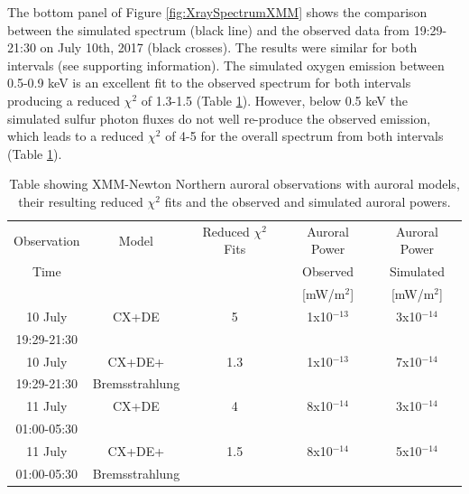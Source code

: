 \documentclass[draft]{agujournal2018}
\begin{document}
The bottom panel of Figure \ref{fig:XraySpectrumXMM} shows the comparison between the simulated spectrum (black line) and the observed data from 19:29-21:30 on July 10th, 2017 (black crosses).
The results were similar for both intervals (see supporting information).
The simulated oxygen emission between 0.5-0.9 keV is an excellent fit to the observed spectrum for both intervals producing a reduced $\chi^2$ of 1.3-1.5 (Table \ref{tab:XMMComparison}).
However, below 0.5 keV the simulated sulfur photon fluxes do not well re-produce the observed emission, which leads to a reduced $\chi^2$ of 4-5 for the overall spectrum from both intervals (Table \ref{tab:XMMComparison}).

\begin{table}
    \centering
    \begin{tabular}{c|c|c|c|c}
    Observation & Model & Reduced $\chi^2$ Fits & Auroral Power & Auroral Power  \\
    Time &  &  & Observed & Simulated  \\
     &  &  & [mW/m$^2$] & [mW/m$^2$] \\ \cline{1-5}
     10 July     & CX+DE          & 5   & 1x10$^{-13}$ & 3x10$^{-14}$ \\
     19:29-21:30 &                &     &              &              \\ \cline{1-5}
     10 July     & CX+DE+         & 1.3 & 1x10$^{-13}$ & 7x10$^{-14}$ \\
     19:29-21:30 & Bremsstrahlung &     &              &              \\ \cline{1-5}
     11 July     & CX+DE          & 4   & 8x10$^{-14}$ & 3x10$^{-14}$ \\
     01:00-05:30 &                &     &              &              \\ \cline{1-5}
     11 July     & CX+DE+         & 1.5 & 8x10$^{-14}$ & 5x10$^{-14}$ \\
     01:00-05:30 & Bremsstrahlung &     &              &              \\ \cline{1-5}
    \end{tabular}
    \label{tab:XMMComparison}
    \caption{Table showing XMM-Newton Northern auroral observations with auroral models, their resulting reduced $\chi^2$ fits and the observed and simulated auroral powers.}
\end{table}
\end{document}
